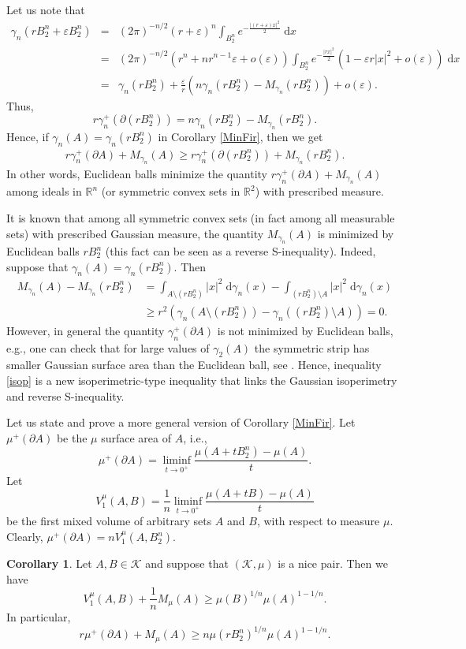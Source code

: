 \documentclass[11pt]{article}
\newcommand{\call}[4]{\int_{#1}^{#2} {#3} \; \textrm{d} {#4}}
\newcommand{\mb}[1]{\mathbb{{#1}}}
\newcommand{\mc}[1]{\mathcal{{#1}}}
\newcommand{\1}{\mathbf{{1}}}
\newcommand{\e}{\varepsilon}
\theoremstyle{definition}
\newtheorem{cor}{Corollary}
\begin{document}
\noindent
Let us note that
\begin{eqnarray*}
	\gamma_n(rB_2^n + \e B_2^n) & = & (2 \pi)^{-n/2}(r+\e)^n \call{B_2^n}{}{e^{-\frac{|(r+\e)x|^2}{2}}}{x} \\ & = & (2 \pi)^{-n/2}(r^n + nr^{n-1}\e + o(\e)) \call{B_2^n}{}{e^{-\frac{|rx|^2}{2}}(1-\e r|x|^2 + o(\e))}{x} \\ & = & \gamma_n(rB_2^n) + \frac{\e}{r} \left( n\gamma_n(rB_2^n) - M_{\gamma_n}(rB_2^n) \right) + o(\e).
\end{eqnarray*}
Thus,
\[
	r \gamma_n^+(\partial (rB_2^n)) = n \gamma_n(rB_2^n) - M_{\gamma_n}(rB_2^n).
\]
Hence, if $\gamma_n(A) = \gamma_n(rB_2^n)$ in Corollary \ref{MinFir}, then we get
\begin{eqnarray}\label{isop}
	r \gamma_n^+(\partial A) + M_{\gamma_n}(A) \geq r \gamma_n^+(\partial (rB_2^n)) + M_{\gamma_n}(rB_2^n).
\end{eqnarray}
In other words, Euclidean balls minimize the quantity $r \gamma_n^+(\partial A) + M_{\gamma_n}(A)$ among ideals in $\mb{R}^n$ (or symmetric convex sets in $\mb{R}^2$) with prescribed measure.

It is known that among all symmetric convex sets (in fact among all measurable sets) with prescribed Gaussian measure, the quantity $M_{\gamma_n}(A)$ is minimized by Euclidean balls $rB_2^n$ (this fact can be seen as a reverse S-inequality).  Indeed, suppose that $\gamma_n(A)=\gamma_n(rB_2^n)$. Then
\begin{align*}
	M_{\gamma_n}(A) - M_{\gamma_n}(rB_2^n) & = \call{A \setminus (rB_2^n)}{}{|x|^2}{\gamma_n(x)} - \call{(rB_2^n) \setminus A}{}{|x|^2}{\gamma_n(x)} \\
	&  \geq  r^2(\gamma_n(A \setminus (rB_2^n))-\gamma_n((rB_2^n) \setminus A)) = 0.
\end{align*}
However, in general the quantity $\gamma_n^+(\partial A)$ is not minimized by Euclidean balls, e.g., one can check that for large values of $\gamma_2(A)$ the symmetric strip has smaller Gaussian surface area than the Euclidean ball, see \cite[Lemma 3]{LO2}. Hence, inequality \eqref{isop} is a new isoperimetric-type inequality that links the Gaussian isoperimetry and reverse S-inequality.

Let us state and prove a more general version of Corollary \ref{MinFir}. Let $\mu^+(\partial A)$ be the $\mu$ surface area of $A$, i.e.,
\[
\mu^+(\partial A)=\liminf_{t \to 0^+} \frac{\mu(A+tB_2^n)-\mu(A)}{t}.
\]
Let
\[
	V_1^\mu(A,B) = \frac{1}{n} \liminf_{t \to 0^+} \frac{\mu(A+tB)-\mu(A)}{t}
\]
be the first mixed volume of arbitrary sets $A$ and $B$, with respect to measure $\mu$. Clearly, $\mu^+(\partial A)=nV_1^\mu(A,B_2^n)$.
\begin{cor}\label{MinFirGen}
Let $A,B \in \mc{K}$ and suppose that $(\mc{K},\mu)$ is a nice pair. Then we have
\begin{equation}\label{MF}
	V_1^\mu(A,B) + \frac{1}{n} M_\mu(A) \geq \mu(B)^{1/n} \mu(A)^{1-1/n}.
\end{equation}
In particular,
\begin{equation}\label{MFB}
	r \mu^+(\partial A) + M_\mu(A) \geq n \mu(r B_2^n)^{1/n} \mu(A)^{1-1/n}.
\end{equation}
\end{cor}
\end{document}
